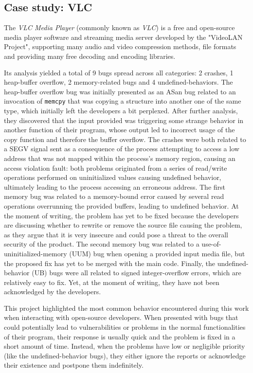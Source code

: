 \newpage
\subsection{Case study: VLC}
The \textit{VLC Media Player} (commonly known as \textit{VLC}) \cite{vlc} is a free and open-source media player software and streaming media server developed by the "VideoLAN Project", supporting many audio and video compression methods, file formats and providing many free decoding and encoding libraries.

Its analysis yielded a total of 9 bugs spread across all categories: 2 crashes, 1 heap-buffer overflow, 2 memory-related bugs and 4 undefined-behaviors.
The heap-buffer overflow bug was initially presented as an ASan bug related to an invocation of \verb|memcpy| that was copying a structure into another one of the same type, which initially left the developers a bit perplexed. After further analysis, they discovered that the input provided was triggering some strange behavior in another function of their program, whose output led to incorrect usage of the copy function and therefore the buffer overflow.
The crashes were both related to a SEGV signal sent as a consequence of the process attempting to access a low address that was not mapped within the process's memory region, causing an access violation fault: both problems originated from a series of read/write operations performed on uninitialized values causing undefined behavior, ultimately leading to the process accessing an erroneous address.
The first memory bug was related to a memory-bound error caused by several read operations overrunning the provided buffers, leading to undefined behavior. At the moment of writing, the problem has yet to be fixed because the developers are discussing whether to rewrite or remove the source file causing the problem, as they argue that it is very insecure and could pose a threat to the overall security of the product.
The second memory bug was related to a use-of-uninitialized-memory (UUM) bug when opening a provided input media file, but the proposed fix has yet to be merged with the main code.
Finally, the undefined-behavior (UB) bugs were all related to signed integer-overflow errors, which are relatively easy to fix. Yet, at the moment of writing, they have not been acknowledged by the developers.

This project highlighted the most common behavior encountered during this work when interacting with open-source developers.
When presented with bugs that could potentially lead to vulnerabilities or problems in the normal functionalities of their program, their response is usually quick and the problem is fixed in a short amount of time. 
Instead, when the problems have low or negligible priority (like the undefined-behavior bugs), they either ignore the reports or acknowledge their existence and postpone them indefinitely.



